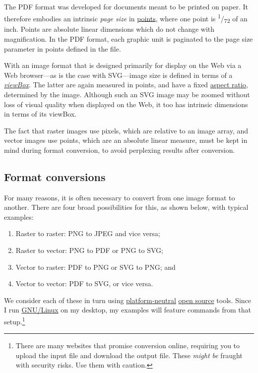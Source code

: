 \documentclass[
  12pt,
  british,
  a4paper,
  rgb,
  dvipsnames,
  svgnames,
  hyphens]{article}
\providecommand{\tightlist}{%
  \setlength{\itemsep}{0pt}\setlength{\parskip}{0pt}}
\begin{document}
The PDF format was developed for documents meant to be printed on paper.
It therefore embodies an intrinsic \emph{page size} in
\href{https://en.wikipedia.org/wiki/Point_(typography)}{points}, where
one point is \textsuperscript{1}/\textsubscript{72} of an inch. Points
are absolute linear dimensions which do not change with magnification.
In the PDF format, each graphic unit is paginated to the page size
parameter in points defined in the file.

With an image format that is designed primarily for display on the Web
via a Web browser---as is the case with SVG---image size is defined in
terms of a
\href{https://developer.mozilla.org/en-US/docs/Web/SVG/Attribute/viewBox}{\emph{viewBox}}.
The latter are again measured in points, and have a fixed
\href{https://en.wikipedia.org/wiki/Aspect_ratio}{aspect ratio},
determined by the image. Although such an SVG image may be zoomed
without loss of visual quality when displayed on the Web, it too has
intrinsic dimensions in terms of its viewBox.

The fact that raster images use pixels, which are relative to an image
array, and vector images use points, which are an absolute linear
measure, must be kept in mind during format conversion, to avoid
perplexing results after conversion.

\hypertarget{format-conversions}{%
\subsection{Format conversions}\label{format-conversions}}

For many reasons, it is often necessary to convert from one image format
to another. There are four broad possibilities for this, as shown below,
with typical examples:

\begin{enumerate}
\tightlist
\item
  Raster to raster: PNG to JPEG and vice versa;
\item
  Raster to vector: PNG to PDF or PNG to SVG;
\item
  Vector to raster: PDF to PNG or SVG to PNG; and
\item
  Vector to vector: PDF to SVG, or vice versa.
\end{enumerate}

We consider each of these in turn using
\href{https://itlaw.wikia.org/wiki/Platform_neutral}{platform-neutral}
\href{https://opensource.com/resources/what-open-source}{open source}
tools. Since I run
\href{https://en.wikipedia.org/wiki/GNU/Linux_naming_controversy}{GNU/Linux}
on my desktop, my examples will feature commands from that
setup.\footnote{There are many websites that promise conversion online,
  requiring you to upload the input file and download the output file.
  These \emph{might be} fraught with security risks. Use them with
  caution.}
\end{document}

